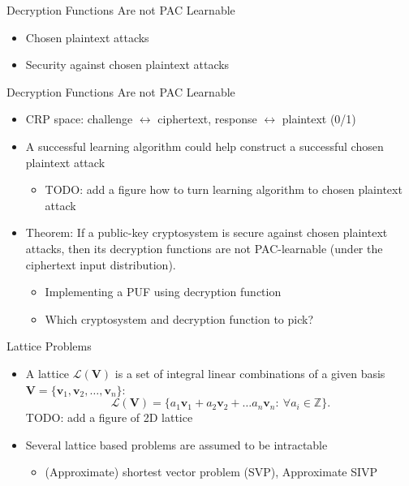 \begin{frame}{Decryption Functions Are not PAC Learnable}
\begin{itemize}
    \item Chosen plaintext attacks    
    \item Security against chosen plaintext attacks
\end{itemize}    
\end{frame}

\begin{frame}{Decryption Functions Are not PAC Learnable}
\begin{itemize}
    \item CRP space: challenge $\leftrightarrow$ ciphertext, response $\leftrightarrow$ plaintext (0/1)
    \item A successful learning algorithm could help construct a successful chosen plaintext attack
    \begin{itemize}
        \item TODO: add a figure how to turn learning algorithm to chosen plaintext attack
    \end{itemize}
    \item Theorem: If a public-key cryptosystem is secure against chosen plaintext attacks, then its decryption functions are not PAC-learnable (under the ciphertext input distribution).
    \begin{itemize}
        \item Implementing a PUF using decryption function
        \item Which cryptosystem and decryption function to pick?
    \end{itemize}
\end{itemize}    
\end{frame}

\begin{frame}{Lattice Problems}
\begin{itemize}
    \item A lattice $\mathcal{L}(\mathbf{V})$ is a set of integral linear combinations of a given basis $\mathbf{V}=\{\mathbf{v}_1,\mathbf{v}_2,\ldots, \mathbf{v}_n\}$:
\begin{equation*}
\mathcal{L}(\mathbf{V}) = \{a_1\mathbf{v}_1 + a_2\mathbf{v}_2+\ldots a_n\mathbf{v}_n: \: \forall a_i \in \mathbb{Z}\}.
\end{equation*}
TODO: add a figure of 2D lattice
    \item Several lattice based problems are assumed to be intractable 
    \begin{itemize}
        \item (Approximate) shortest vector problem (SVP), Approximate SIVP
    \end{itemize}
\end{itemize}
\end{frame}


